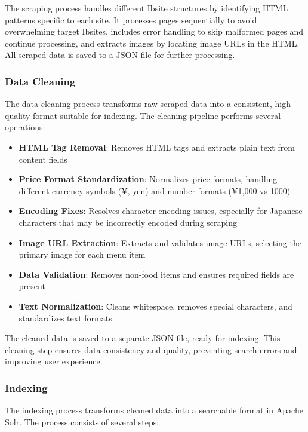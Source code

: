 \documentclass[11pt,a4paper]{article}
\begin{document}
The scraping process handles different Ibsite structures by identifying HTML patterns specific to each site. It processes pages sequentially to avoid overwhelming target Ibsites, includes error handling to skip malformed pages and continue processing, and extracts images by locating image URLs in the HTML. All scraped data is saved to a JSON file for further processing.

\subsubsection{Data Cleaning}

The data cleaning process transforms raw scraped data into a consistent, high-quality format suitable for indexing. The cleaning pipeline performs several operations:

\begin{itemize}
    \item \textbf{HTML Tag Removal}: Removes HTML tags and extracts plain text from content fields
    \item \textbf{Price Format Standardization}: Normalizes price formats, handling different currency symbols (¥, yen) and number formats (¥1,000 vs 1000)
    \item \textbf{Encoding Fixes}: Resolves character encoding issues, especially for Japanese characters that may be incorrectly encoded during scraping
    \item \textbf{Image URL Extraction}: Extracts and validates image URLs, selecting the primary image for each menu item
    \item \textbf{Data Validation}: Removes non-food items and ensures required fields are present
    \item \textbf{Text Normalization}: Cleans whitespace, removes special characters, and standardizes text formats
\end{itemize}

The cleaned data is saved to a separate JSON file, ready for indexing. This cleaning step ensures data consistency and quality, preventing search errors and improving user experience.

\subsubsection{Indexing}

The indexing process transforms cleaned data into a searchable format in Apache Solr. The process consists of several steps:
\end{document}
